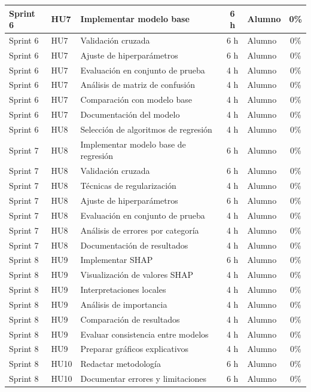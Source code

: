 \documentclass[
11pt, %
]{charter}
\begin{document}
\begin{table}[htpb]
\begin{tabularx}{\linewidth}{@{}|l|l|X|c|l|c|@{}}
Sprint 6 & HU7 & Implementar modelo base & 6 h & Alumno & 0\% \\ \hline
Sprint 6 & HU7 & Validación cruzada & 6 h & Alumno & 0\% \\ \hline
Sprint 6 & HU7 & Ajuste de hiperparámetros & 6 h & Alumno & 0\% \\ \hline
Sprint 6 & HU7 & Evaluación en conjunto de prueba & 4 h & Alumno & 0\% \\ \hline
Sprint 6 & HU7 & Análisis de matriz de confusión & 4 h & Alumno & 0\% \\ \hline
Sprint 6 & HU7 & Comparación con modelo base & 4 h & Alumno & 0\% \\ \hline
Sprint 6 & HU7 & Documentación del modelo & 4 h & Alumno & 0\% \\ \hline
Sprint 6 & HU8 & Selección de algoritmos de regresión & 4 h & Alumno & 0\% \\ \hline

Sprint 7 & HU8 & Implementar modelo base de regresión & 6 h & Alumno & 0\% \\ \hline
Sprint 7 & HU8 & Validación cruzada & 6 h & Alumno & 0\% \\ \hline
Sprint 7 & HU8 & Técnicas de regularización & 4 h & Alumno & 0\% \\ \hline
Sprint 7 & HU8 & Ajuste de hiperparámetros & 6 h & Alumno & 0\% \\ \hline
Sprint 7 & HU8 & Evaluación en conjunto de prueba & 4 h & Alumno & 0\% \\ \hline
Sprint 7 & HU8 & Análisis de errores por categoría & 4 h & Alumno & 0\% \\ \hline
Sprint 7 & HU8 & Documentación de resultados & 4 h & Alumno & 0\% \\ \hline

Sprint 8 & HU9 & Implementar SHAP & 6 h & Alumno & 0\% \\ \hline
Sprint 8 & HU9 & Visualización de valores SHAP & 4 h & Alumno & 0\% \\ \hline
Sprint 8 & HU9 & Interpretaciones locales & 4 h & Alumno & 0\% \\ \hline
Sprint 8 & HU9 & Análisis de importancia & 4 h & Alumno & 0\% \\ \hline
Sprint 8 & HU9 & Comparación de resultados & 4 h & Alumno & 0\% \\ \hline
Sprint 8 & HU9 & Evaluar consistencia entre modelos & 4 h & Alumno & 0\% \\ \hline
Sprint 8 & HU9 & Preparar gráficos explicativos & 4 h & Alumno & 0\% \\ \hline
Sprint 8 & HU10 & Redactar metodología & 6 h & Alumno & 0\% \\ \hline
Sprint 8 & HU10 & Documentar errores y limitaciones & 6 h & Alumno & 0\% \\ \hline


\end{tabularx}
\end{table}
\end{document}
